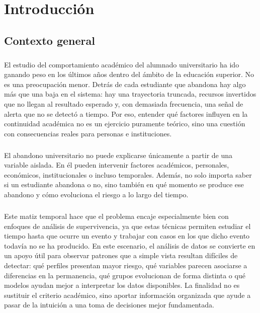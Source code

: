 \chapter{Introducción}
\label{ch:introduccion}

\section{Contexto general}

\paragraph*{}El estudio del comportamiento académico del alumnado universitario ha ido ganando peso en los últimos años dentro del ámbito de la educación superior. No es una preocupación menor. Detrás de cada estudiante que abandona hay algo más que una baja en el sistema: hay una trayectoria truncada, recursos invertidos que no llegan al resultado esperado y, con demasiada frecuencia, una señal de alerta que no se detectó a tiempo. Por eso, entender qué factores influyen en la continuidad académica no es un ejercicio puramente teórico, sino una cuestión con consecuencias reales para personas e instituciones.

\paragraph*{}El abandono universitario no puede explicarse únicamente a partir de una variable aislada. En él pueden intervenir factores académicos, personales, económicos, institucionales o incluso temporales. Además, no solo importa saber si un estudiante abandona o no, sino también en qué momento se produce ese abandono y cómo evoluciona el riesgo a lo largo del tiempo.

\paragraph*{}Este matiz temporal hace que el problema encaje especialmente bien con enfoques de análisis de supervivencia, ya que estas técnicas permiten estudiar el tiempo hasta que ocurre un evento y trabajar con casos en los que dicho evento todavía no se ha producido. En este escenario, el análisis de datos se convierte en un apoyo útil para observar patrones que a simple vista resultan difíciles de detectar: qué perfiles presentan mayor riesgo, qué variables parecen asociarse a diferencias en la permanencia, qué grupos evolucionan de forma distinta o qué modelos ayudan mejor a interpretar los datos disponibles. La finalidad no es sustituir el criterio académico, sino aportar información organizada que ayude a pasar de la intuición a una toma de decisiones mejor fundamentada.

